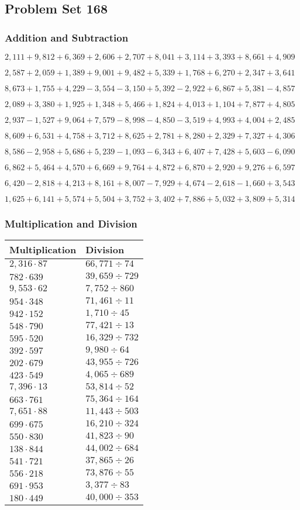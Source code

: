 \hypertarget{problem-set-168}{%
\subsection{Problem Set 168}\label{problem-set-168}}

\hypertarget{addition-and-subtraction}{%
\subsubsection{Addition and
Subtraction}\label{addition-and-subtraction}}

\(2,111+9,812+6,369+2,606+2,707+8,041+3,114+3,393+8,661+4,909\)

\(2,587+2,059+1,389+9,001+9,482+5,339+1,768+6,270+2,347+3,641\)

\(8,673+1,755+4,229-3,554-3,150+5,392-2,922+6,867+5,381-4,857\)

\(2,089+3,380+1,925+1,348+5,466+1,824+4,013+1,104+7,877+4,805\)

\(2,937-1,527+9,064+7,579-8,998-4,850-3,519+4,993+4,004+2,485\)

\(8,609+6,531+4,758+3,712+8,625+2,781+8,280+2,329+7,327+4,306\)

\(8,586-2,958+5,686+5,239-1,093-6,343+6,407+7,428+5,603-6,090\)

\(6,862+5,464+4,570+6,669+9,764+4,872+6,870+2,920+9,276+6,597\)

\(6,420-2,818+4,213+8,161+8,007-7,929+4,674-2,618-1,660+3,543\)

\(1,625+6,141+5,574+5,504+3,752+3,402+7,886+5,032+3,809+5,314\)

\hypertarget{multiplication-and-division}{%
\subsubsection{Multiplication and
Division}\label{multiplication-and-division}}

\begin{longtable}[]{@{}ll@{}}
\toprule
Multiplication & Division\tabularnewline
\midrule
\endhead
\(2,316\cdot87\) & \(66,771÷74\)\tabularnewline
\(782\cdot639\) & \(39,659÷729\)\tabularnewline
\(9,553\cdot62\) & \(7,752÷860\)\tabularnewline
\(954\cdot348\) & \(71,461÷11\)\tabularnewline
\(942\cdot152\) & \(1,710÷45\)\tabularnewline
\(548\cdot790\) & \(77,421÷13\)\tabularnewline
\(595\cdot520\) & \(16,329÷732\)\tabularnewline
\(392\cdot597\) & \(9,980÷64\)\tabularnewline
\(202\cdot679\) & \(43,955÷726\)\tabularnewline
\(423\cdot549\) & \(4,065÷689\)\tabularnewline
\(7,396\cdot13\) & \(53,814÷52\)\tabularnewline
\(663\cdot761\) & \(75,364÷164\)\tabularnewline
\(7,651\cdot88\) & \(11,443÷503\)\tabularnewline
\(699\cdot675\) & \(16,210÷324\)\tabularnewline
\(550\cdot830\) & \(41,823÷90\)\tabularnewline
\(138\cdot844\) & \(44,002÷684\)\tabularnewline
\(541\cdot721\) & \(37,865÷26\)\tabularnewline
\(556\cdot218\) & \(73,876÷55\)\tabularnewline
\(691\cdot953\) & \(3,377÷83\)\tabularnewline
\(180\cdot449\) & \(40,000÷353\)\tabularnewline
\bottomrule
\end{longtable}
